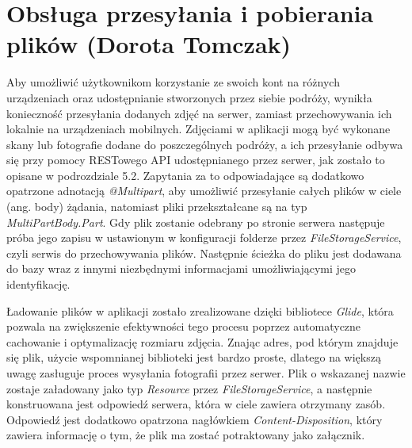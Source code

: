 \documentclass[10pt,twoside,a4paper]{report}
\begin{document}
\section{Obsługa przesyłania i pobierania plików (Dorota Tomczak)}
\par Aby umożliwić użytkownikom korzystanie ze swoich kont na różnych urządzeniach oraz udostępnianie stworzonych przez siebie podróży, wynikła konieczność przesyłania dodanych zdjęć na serwer, zamiast przechowywania ich lokalnie na urządzeniach mobilnych. Zdjęciami w aplikacji mogą być wykonane skany lub fotografie dodane do poszczególnych podróży, a ich przesyłanie odbywa się przy pomocy RESTowego API udostępnianego przez serwer, jak zostało to opisane w podrozdziale 5.2. Zapytania za to odpowiadające są dodatkowo opatrzone adnotacją \textit{@Multipart}, aby umożliwić przesyłanie całych plików w ciele (ang. body) żądania, natomiast pliki przekształcane są na typ \textit{MultiPartBody.Part}. Gdy plik zostanie odebrany po stronie serwera następuje próba jego zapisu w ustawionym w konfiguracji folderze przez \textit{FileStorageService}, czyli serwis do przechowywania plików. Następnie ścieżka do pliku jest dodawana do bazy wraz z innymi niezbędnymi informacjami umożliwiającymi jego identyfikację.

\par Ładowanie plików w aplikacji zostało zrealizowane dzięki bibliotece \textit{Glide}\cite{Glide}, która pozwala na zwiększenie efektywności tego procesu poprzez automatyczne cachowanie i optymalizację rozmiaru zdjęcia. Znając adres, pod którym znajduje się plik, użycie wspomnianej biblioteki jest bardzo proste, dlatego na większą uwagę zasługuje proces wysyłania fotografii przez serwer. Plik o wskazanej nazwie zostaje załadowany jako typ \textit{Resource} przez \textit{FileStorageService}, a następnie konstruowana jest odpowiedź serwera, która w ciele zawiera otrzymany zasób. Odpowiedź jest dodatkowo opatrzona nagłówkiem \textit{Content-Disposition}, który zawiera informację o tym, że plik ma zostać potraktowany jako załącznik. 
\end{document}
